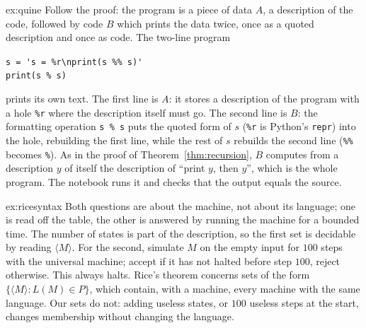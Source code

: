 \begin{solution}{ex:quine}
\idea Follow the proof: the program is a piece of data $A$, a description of the code, followed by code $B$ which prints the data twice, once as a quoted description and once as code.
\writeup The two-line program
\begin{center}
\verb|s = 's = %r\nprint(s %% s)'|\\
\verb|print(s % s)|
\end{center}
prints its own text. The first line is $A$: it stores a description of the program with a hole \verb|%r| where the description itself must go. The second line is $B$: the formatting operation \verb|s % s| puts the quoted form of $s$ (\verb|%r| is Python's \texttt{repr}) into the hole, rebuilding the first line, while the rest of $s$ rebuilds the second line (\verb|%%| becomes \verb|%|). As in the proof of Theorem~\ref{thm:recursion}, $B$ computes from a description $y$ of itself the description of ``print $y$, then $y$'', which is the whole program. The notebook runs it and checks that the output equals the source.
\end{solution}

\begin{solution}{ex:ricesyntax}
\idea Both questions are about the machine, not about its language; one is read off the table, the other is answered by running the machine for a bounded time.
\writeup The number of states is part of the description, so the first set is decidable by reading $\langle M\rangle$. For the second, simulate $M$ on the empty input for $100$ steps with the universal machine; accept if it has not halted before step $100$, reject otherwise. This always halts. Rice's theorem concerns sets of the form $\{\langle M\rangle:L(M)\in P\}$, which contain, with a machine, every machine with the same language. Our sets do not: adding useless states, or $100$ useless steps at the start, changes membership without changing the language.
\end{solution}

